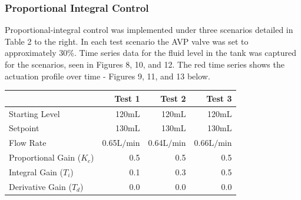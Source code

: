 \documentclass{article}
\begin{document}
\clearpage

\subsubsection{Proportional Integral Control}

\begin{minipage}{0.4\textwidth}
	Proportional-integral control was implemented under three scenarios detailed in Table 2 to the right. In each test scenario the AVP valve was set to approximately 30\%. Time series data for the fluid level in the tank was captured for the scenarios, seen in Figures 8, 10, and 12. The red time series shows the actuation profile over time - Figures 9, 11, and 13 below. 
\end{minipage}
\hspace{0.5cm}
\begin{minipage}{0.45\textwidth}
	\small
	\begin{tabular}{lrrr}
		\toprule
		& Test 1 & Test 2 & Test 3 \\
		\midrule
		Starting Level & 120$\si{\milli\liter}$ & 120$\si{\milli\liter}$ & 120$\si{\milli\liter}$ \\
		Setpoint & 130$\si{\milli\liter}$ & 130$\si{\milli\liter}$ & 130$\si{\milli\liter}$ \\
		Flow Rate & 0.65$\si{\liter\per\minute}$ & 0.64$\si{\liter\per\minute}$ & 0.66$\si{\liter\per\minute}$ \\
		Proportional Gain ($K_c$) & 0.5 & 0.5 & 0.5 \\
		Integral Gain ($T_i$) & 0.1 & 0.3 & 0.5 \\
		Derivative Gain ($T_d$) & 0.0 & 0.0 & 0.0 \\
		\bottomrule
	\end{tabular}
\end{minipage}
\end{document}
